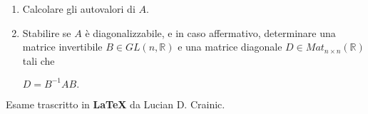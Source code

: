 \documentclass[fleqn]{article}
\begin{document}
\begin{enumerate}
   \begin{enumerate}
      \item Calcolare gli autovalori di $A$.
      \item Stabilire se $A$ è diagonalizzabile, e in caso affermativo, determinare una matrice invertibile
      $B \in GL(n,\mathbb{R})$ e una matrice diagonale $D \in Mat_{n \times n}(\mathbb{R})$ tali che  
      \begin{center}
         $D= B^{-1}AB.$
      \end{center} 
   \end{enumerate}
  
\end{enumerate}
Esame trascritto in \textbf{\LaTeX} da Lucian D. Crainic.
\end{document}

